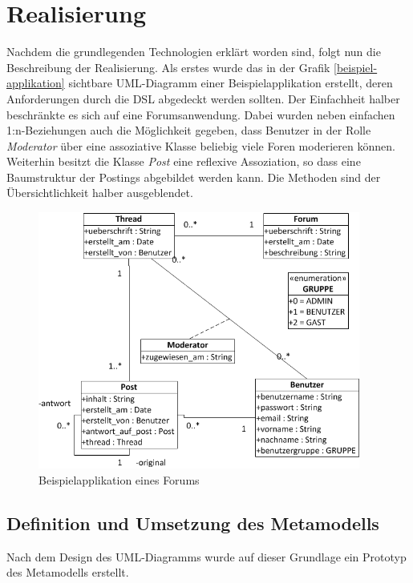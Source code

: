 \documentclass[a4paper,12pt]{scrreprt}
\begin{document}
\chapter{Realisierung}
\label{ch:realisierung}
Nachdem die grundlegenden Technologien erklärt worden sind, folgt nun die Beschreibung der Realisierung.
Als erstes wurde das in der Grafik \ref{beispiel-applikation} sichtbare UML-Diagramm einer Beispielapplikation erstellt, deren Anforderungen durch die DSL abgedeckt werden sollten. Der Einfachheit halber beschränkte es sich auf eine Forumsanwendung. Dabei wurden neben einfachen 1:n-Beziehungen auch die Möglichkeit gegeben, dass Benutzer in der Rolle \textit{Moderator} über eine assoziative Klasse beliebig viele Foren moderieren können.
Weiterhin besitzt die Klasse \textit{Post} eine reflexive Assoziation, so dass eine Baumstruktur der Postings abgebildet werden kann.
Die Methoden sind der Übersichtlichkeit halber ausgeblendet.

\begin{figure}[h]
	\centering
		\includegraphics[width=400px]{diagramme/beispiel-applikation.png}
		\caption{Beispielapplikation eines Forums}
		\label{fig:beispiel-applikation}
\end{figure}

\section{Definition und Umsetzung des  Metamodells}
Nach dem Design des UML-Diagramms wurde auf dieser Grundlage ein Prototyp des  Metamodells erstellt. 
\end{document}
